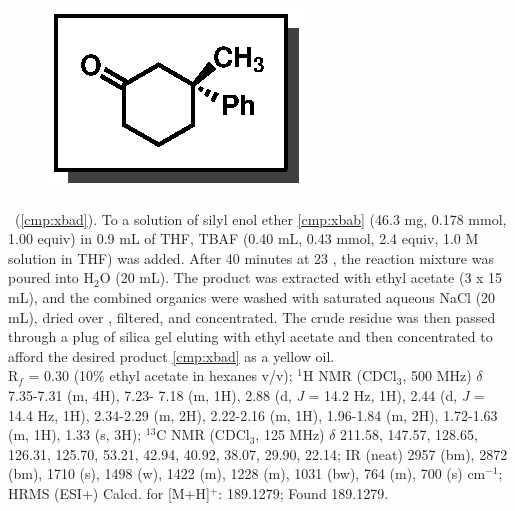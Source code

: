 \vspace{10pt}
\begin{figure}
  \vspace{-25pt}
  \begin{center}
    \includegraphics[scale=0.8]{chp_singlecarbon/images/xbad}
  \end{center}
  \vspace{-30pt}
\end{figure}\noindent \textbf{\CMPxbad}\ (\ref{cmp:xbad}). To a solution of silyl enol ether
\ref{cmp:xbab} (46.3 mg, 0.178 mmol, 1.00 equiv) in 0.9 mL of THF, TBAF (0.40 mL, 0.43 mmol, 2.4
equiv, 1.0 M solution in THF) was added. After 40 minutes at 23 \degc, the reaction mixture was
poured into H$_2$O (20 mL). The product was extracted with ethyl acetate (3 x 15 mL), and the
combined organics were washed with saturated aqueous NaCl (20 mL), dried over , filtered,
and concentrated. The crude residue was then passed through a plug of silica gel eluting with ethyl acetate and then
concentrated to afford the desired product \ref{cmp:xbad} as a yellow oil. \\
R$_f$ = 0.30 (10\% ethyl acetate in hexanes v/v); $^1$H NMR (CDCl$_3$, 500 MHz) $\delta$ 7.35-7.31
(m, 4H), 7.23- 7.18 (m, 1H), 2.88 (d, \textit{J} = 14.2 Hz, 1H), 2.44 (d, \textit{J} = 14.4 Hz, 1H),
2.34-2.29 (m, 2H), 2.22-2.16 (m, 1H), 1.96-1.84 (m, 2H), 1.72-1.63 (m, 1H), 1.33 (s, 3H); $^{13}$C
NMR (CDCl$_3$, 125 MHz) $\delta$ 211.58, 147.57, 128.65, 126.31, 125.70, 53.21, 42.94, 40.92, 38.07,
29.90, 22.14; IR (neat) 2957 (bm), 2872 (bm), 1710 (s), 1498 (w), 1422 (m), 1228 (m), 1031 (bw), 764
(m), 700 (s) cm$^{-1}$; HRMS (ESI+) Calcd. for  [M+H]$^+$: 189.1279; Found 189.1279.

